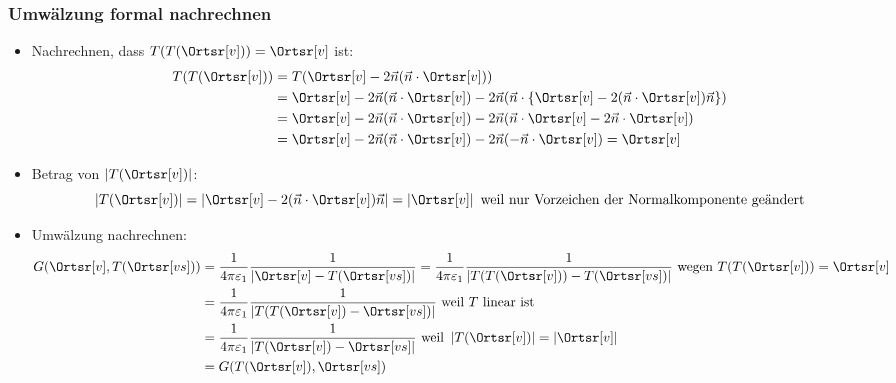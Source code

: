 \begin{frame}
\frametitle{Umwälzung formal nachrechnen}

\begin{itemize}[<+->]
\item Nachrechnen, dass $T(T(\Ortsr[v])) = \Ortsr[v]$ ist:
  \begin{align*}
    T(T(\Ortsr[v])) &= T(\Ortsr[v] - 2 \vec{n} (\vec{n}\cdot \Ortsr[v]))\\
    & = \Ortsr[v] - 2 \vec{n} (\vec{n}\cdot \Ortsr[v]) - 2 \vec{n} (\vec{n}\cdot \left\{ \Ortsr[v] - 2 (\vec{n}\cdot \Ortsr[v]) \vec{n}  \right\} )  \\ 
    & = \Ortsr[v] - 2 \vec{n} (\vec{n}\cdot \Ortsr[v]) - 2 \vec{n} (\vec{n}\cdot \Ortsr[v] - 2 \vec{n}\cdot \Ortsr[v])\\   
                         & = \Ortsr[v] - 2 \vec{n} (\vec{n}\cdot \Ortsr[v]) - 2 \vec{n} (- \vec{n}\cdot \Ortsr[v]) = \Ortsr[v]
  \end{align*}
\item Betrag von $\left|T(\Ortsr[v])\right|$:
  \begin{equation*}
    \left|T(\Ortsr[v])\right| = \left| \Ortsr[v] - 2 (\vec{n}\cdot \Ortsr[v]) \vec{n} \right| = \left| \Ortsr[v] \right| \text{ weil nur Vorzeichen der Normalkomponente geändert}
    \end{equation*}
  \item Umwälzung nachrechnen:
    \begin{align*}
      G(\Ortsr[v], T(\Ortsr[vs])) &= \frac{1}{4\pi\varepsilon_1} \frac{1}{\left|\Ortsr[v] -  T(\Ortsr[vs]) \right|} = \frac{1}{4\pi\varepsilon_1} \frac{1}{\left|T(T(\Ortsr[v])) - T(\Ortsr[vs]) \right|} \text{ wegen } T(T(\Ortsr[v])) = \Ortsr[v]\\
      &= \frac{1}{4\pi\varepsilon_1} \frac{1}{\left|T( T(\Ortsr[v]) - \Ortsr[vs] )\right|} \text{ weil } T \text{ linear ist}\\
                                          &= \frac{1}{4\pi\varepsilon_1} \frac{1}{\left| T(\Ortsr[v]) - \Ortsr[vs] \right|} \text{ weil } \left|T(\Ortsr[v])\right| = \left| \Ortsr[v] \right| \\
                                            &= G(T(\Ortsr[v]), \Ortsr[vs])
    \end{align*}
   
  \end{itemize}


\end{frame}


